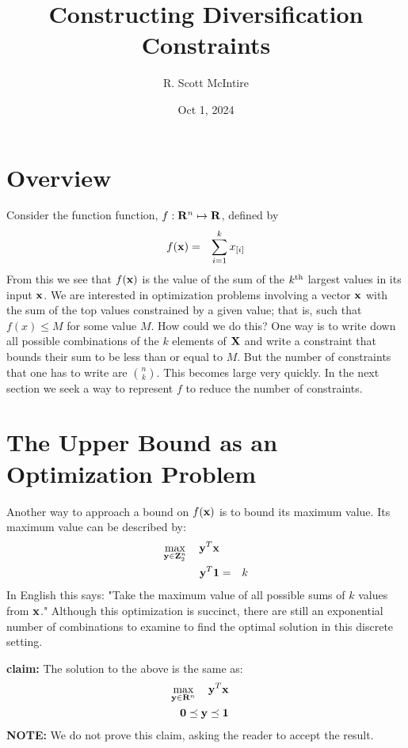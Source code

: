 \documentclass[12pt]{article}
\title{Constructing Diversification Constraints}
\author{R. Scott McIntire}
\date{Oct 1, 2024}
\begin{document}
\maketitle

\section{Overview}
Consider the function function, $f: {\bf R}^n \mapsto {\bf R}$, defined by
\begin{eqnarray}
	f({\bf x}) & = & \sum_{i=1}^k x_{[i]} 
\end{eqnarray}
From this we see that $f({\bf x})$ is the value of the sum of the $k^{\rm th}$ largest values in its input ${\bf x}$.
We are interested in optimization problems involving a vector ${\bf x}$ with the sum of the 
top values constrained by a given value; that is, such that $f(x) \le M$  for some value $M$.
How could we do this? One way is to write down all possible combinations of the $k$ elements of ${\bf X}$ and write a constraint that bounds their sum to be less than or equal to $M$.  But the number of constraints that one has to write are $n \choose k$. This becomes 
large very quickly. In the next section we seek a way to represent $f$ to 
reduce the number of constraints.

\section{The Upper Bound as an Optimization Problem}
Another way to approach a bound on $f({\bf x})$ is to bound its maximum value.
Its maximum value can be described by:
\begin{eqnarray}
\mathop{\rm max}_{{\bf y} \in {\bf Z}_2^n}\limits \quad {\bf y}^T {\bf x} && \\
{\bf y}^T {\bf 1} & = & k 
\end{eqnarray}
In English this says: "Take the maximum value of all possible sums of $k$ values from ${\bf x}$."
Although this optimization is succinct, there are still an exponential number of combinations 
to examine to find the optimal solution in this discrete setting.

{\bf claim:} The solution to the above is the same as: 
\begin{eqnarray}
\mathop{\rm max}_{{\bf y} \in {\bf R}^n}\limits \quad {\bf y}^T {\bf x} &&  \\
{\bf 0} \preceq {\bf y}   \preceq  {\bf 1}&& \\
\end{eqnarray}
{\bf NOTE:} We do not prove this claim, asking the reader to accept the result.
\end{document}
